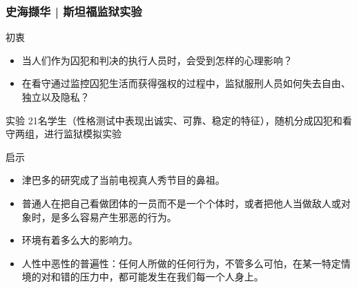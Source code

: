\begin{frame}
  \frametitle{史海撷华 | 斯坦福监狱实验}
  \vspace{-0.7em}
  \begin{block}{初衷}
    \begin{itemize}
      \item 当人们作为囚犯和判决的执行人员时，会受到怎样的心理影响？
      \item 在看守通过监控囚犯生活而获得强权的过程中，监狱服刑人员如何失去自由、独立以及隐私？
    \end{itemize}
  \end{block}
  \vspace{-0.7em}
  \pause
  \begin{block}{实验}
    21名学生（性格测试中表现出诚实、可靠、稳定的特征），随机分成囚犯和看守两组，进行监狱模拟实验
  \end{block}
  \vspace{-0.7em}
  \pause
  \begin{block}{启示}
    \begin{itemize}
      \item 津巴多的研究成了当前电视真人秀节目的鼻祖。
      \item 普通人在把自己看做团体的一员而不是一个个体时，或者把他人当做敌人或对象时，是多么容易产生邪恶的行为。
      \item 环境有着多么大的影响力。
      \item 人性中恶性的普遍性：任何人所做的任何行为，不管多么可怕，在某一特定情境的对和错的压力中，都可能发生在我们每一个人身上。
    \end{itemize}
  \end{block}
\end{frame}

